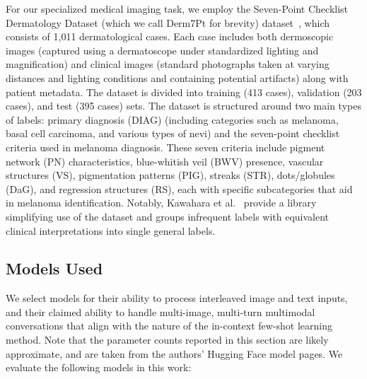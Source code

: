 \documentclass[../ShajiS_RnDReport.tex]{subfiles}
\begin{document}
For our specialized medical imaging task, we employ the Seven-Point Checklist Dermatology Dataset (which we call Derm7Pt for brevity) dataset~\cite{Kawahara2019}, which consists of 1,011 dermatological cases. Each case includes both dermoscopic images (captured using a dermatoscope under standardized lighting and magnification) and clinical images (standard photographs taken at varying distances and lighting conditions and containing potential artifacts) along with patient metadata. The dataset is divided into training (413 cases), validation (203 cases), and test (395 cases) sets. The dataset is structured around two main types of labels: primary diagnosis (DIAG) (including categories such as melanoma, basal cell carcinoma, and various types of nevi) and the seven-point checklist criteria used in melanoma diagnosis. These seven criteria include pigment network (PN) characteristics, blue-whitish veil (BWV) presence, vascular structures (VS), pigmentation patterns (PIG), streaks (STR), dots/globules (DaG), and regression structures (RS), each with specific subcategories that aid in melanoma identification. Notably, Kawahara et al.~\cite{Kawahara2019} provide a library simplifying use of the dataset and groups infrequent labels with equivalent clinical interpretations into single general labels.

\subsection{Models Used}
We select models for their ability to process interleaved image and text inputs, and their claimed ability to handle multi-image, multi-turn multimodal conversations that align with the nature of the in-context few-shot learning method. Note that the parameter counts reported in this section are likely approximate, and are taken from the authors' Hugging Face model pages. We evaluate the following models in this work:
\end{document}
